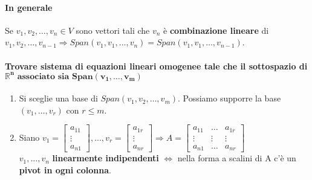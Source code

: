 \documentclass[a4paper, 12pt]{report}
\begin{document}
                    \paragraph{In generale} Se $v_1,v_2,\dots,v_n \in V$ sono vettori tali che $v_n$ è \textbf{combinazione lineare}
                    di $v_1,v_2,\dots,v_{n-1} \Rightarrow Span(v_1,v_1,\dots,v_n)=Span(v_1,v_1,\dots,v_{n-1})$.
                    \paragraph{Trovare sistema di equazioni lineari omogenee tale che il sottospazio di $\boldsymbol{\mathbb{R}^n \text{ associato sia }Span(v_1,\dots,v_m)}$}
                    \begin{enumerate}
                        \item Si sceglie una base di $Span(v_1,v_2,\dots,v_m)$. Possiamo supporre la base $(v_1,\dots,v_r) \text{ con }r\leq m $.
                        \item Siano 
                            $
                            v_1=
                            \begin{bmatrix}
                                a_{11}\\
                                \vdots\\
                                a_{n1}
                            \end{bmatrix}
                            ,...,v_r=
                            \begin{bmatrix}
                                a_{1r}\\
                                \vdots\\
                                a_{nr}
                            \end{bmatrix}
                            \Rightarrow
                            A=
                            \begin{bmatrix}
                                a_{11} & \dots & a_{1r}\\
                                \vdots & \vdots & \vdots\\
                                a_{n1} & \dots & a_{nr}
                            \end{bmatrix}
                            $\\
                            $v_1,\dots,v_n$ \textbf{linearmente indipendenti} $\Leftrightarrow$ nella forma a scalini di A c'è un \textbf{pivot in ogni colonna}.

\end{enumerate}
\end{document}
